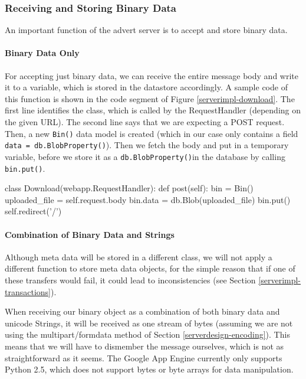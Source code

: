 \subsubsection{Receiving and Storing Binary Data}
An important function of the advert server is to accept and store binary data.

\paragraph{Binary Data Only}
For accepting just binary data, we can receive the entire message body and write
it to a variable, which is stored in the datastore accordingly. A sample code of
this function is shown in the code segment of Figure \ref{serverimpl-download}.
The first line identifies the class, which is called by the RequestHandler
(depending on the given URL). The second line says that we are expecting a POST
request. Then, a new \texttt{Bin()} data model is created (which in our case only
contains a field \texttt{data = db.BlobProperty()}). Then we fetch the body and
put in a temporary variable, before we store it as a \texttt{db.BlobProperty()}in
the database by calling \texttt{bin.put()}.

\begin{figure*}[ht] %
\begin{center}
\begin{code}
class Download(webapp.RequestHandler):
  def post(self):
    bin = Bin()
    uploaded_file = self.request.body
    bin.data = db.Blob(uploaded_file)
    bin.put()
    self.redirect('/')
\end{code}
\caption{Accepting Binary Data.\label{serverimpl-download}}
\end{center}
\end{figure*}
      
\paragraph{Combination of Binary Data and Strings}
Although meta data will be stored in a different class, we will not apply a
different function to store meta data objects, for the simple reason that if one
of these transfers would fail, it could lead to inconsistencies (see Section
\ref{serverimpl-transactions}).

When receiving our binary object as a combination of both binary data and
unicode Strings, it will be received as one stream of bytes (assuming we are not
using the multipart/formdata method of Section \ref{serverdesign-encoding}).
This means that we will have to dismember the message ourselves, which is
not as straightforward as it seems. The Google App Engine currently only
supports Python 2.5, which does not support bytes or byte arrays for data
manipulation.

